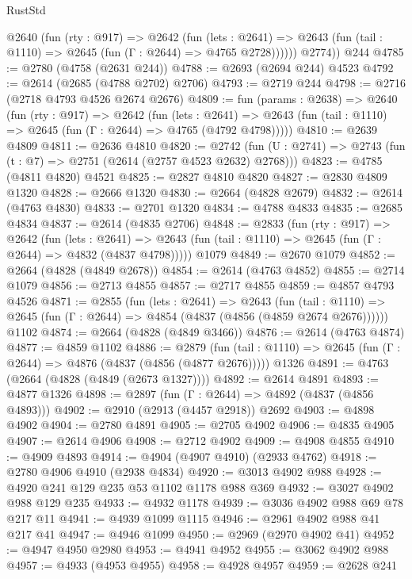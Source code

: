 \begin{lexlean}{RustStd}
\begin{coremodule}
          @2640
            (fun (rty : @917) =>
            @2642
              (fun (lets : @2641) =>
              @2643 (fun (tail : @1110) => @2645 (fun (Γ : @2644) => @4765 @2728))))))
        @2774))
    @244
@4785 := @2780 (@4758 (@2631 @244))
@4788 := @2693 (@2694 @244) @4523
@4792 := @2614 (@2685 (@4788 @2702) @2706)
@4793 := @2719 @244
@4798 := @2716 (@2718 @4793 @4526 @2674 @2676)
@4809 := fun (params : @2638) =>
  @2640
    (fun (rty : @917) =>
    @2642
      (fun (lets : @2641) =>
      @2643 (fun (tail : @1110) => @2645 (fun (Γ : @2644) => @4765 (@4792 @4798)))))
@4810 := @2639 @4809
@4811 := @2636 @4810
@4820 := @2742 (fun (U : @2741) => @2743 (fun (t : @7) => @2751 (@2614 (@2757 @4523 @2632) @2768)))
@4823 := @4785 (@4811 @4820) @4521
@4825 := @2827 @4810 @4820
@4827 := @2830 @4809 @1320
@4828 := @2666 @1320
@4830 := @2664 (@4828 @2679)
@4832 := @2614 (@4763 @4830)
@4833 := @2701 @1320
@4834 := @4788 @4833
@4835 := @2685 @4834
@4837 := @2614 (@4835 @2706)
@4848 := @2833
    (fun (rty : @917) =>
    @2642
      (fun (lets : @2641) =>
      @2643 (fun (tail : @1110) => @2645 (fun (Γ : @2644) => @4832 (@4837 @4798)))))
    @1079
@4849 := @2670 @1079
@4852 := @2664 (@4828 (@4849 @2678))
@4854 := @2614 (@4763 @4852)
@4855 := @2714 @1079
@4856 := @2713 @4855
@4857 := @2717 @4855
@4859 := @4857 @4793 @4526
@4871 := @2855
    (fun (lets : @2641) =>
    @2643
      (fun (tail : @1110) => @2645 (fun (Γ : @2644) => @4854 (@4837 (@4856 (@4859 @2674 @2676))))))
    @1102
@4874 := @2664 (@4828 (@4849 @3466))
@4876 := @2614 (@4763 @4874)
@4877 := @4859 @1102
@4886 := @2879
    (fun (tail : @1110) => @2645 (fun (Γ : @2644) => @4876 (@4837 (@4856 (@4877 @2676)))))
    @1326
@4891 := @4763 (@2664 (@4828 (@4849 (@2673 @1327))))
@4892 := @2614 @4891
@4893 := @4877 @1326
@4898 := @2897 (fun (Γ : @2644) => @4892 (@4837 (@4856 @4893)))
@4902 := @2910 (@2913 (@4457 @2918)) @2692
@4903 := @4898 @4902
@4904 := @2780 @4891
@4905 := @2705 @4902
@4906 := @4835 @4905
@4907 := @2614 @4906
@4908 := @2712 @4902
@4909 := @4908 @4855
@4910 := @4909 @4893
@4914 := @4904 (@4907 @4910) (@2933 @4762)
@4918 := @2780 @4906 @4910 (@2938 @4834)
@4920 := @3013 @4902 @988
@4928 := @4920 @241 @129 @235 @53 @1102 @1178 @988 @369
@4932 := @3027 @4902 @988 @129 @235
@4933 := @4932 @1178
@4939 := @3036 @4902 @988 @69 @78 @217 @11
@4941 := @4939 @1099 @1115
@4946 := @2961 @4902 @988 @41 @217 @41
@4947 := @4946 @1099
@4950 := @2969 (@2970 @4902 @41)
@4952 := @4947 @4950 @2980
@4953 := @4941 @4952
@4955 := @3062 @4902 @988
@4957 := @4933 (@4953 @4955)
@4958 := @4928 @4957
@4959 := @2628 @241

\end{coremodule}
\end{lexlean}
